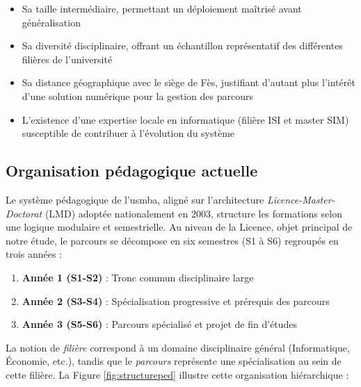 \documentclass[french,12pt]{report} %
\begin{document}
\begin{itemize}
    \item Sa taille intermédiaire, permettant un déploiement maîtrisé avant généralisation
    \item Sa diversité disciplinaire, offrant un échantillon représentatif des différentes filières de l'université
    \item Sa distance géographique avec le siège de Fès, justifiant d'autant plus l'intérêt d'une solution numérique pour la gestion des parcours
    \item L'existence d'une expertise locale en informatique (filière ISI et master SIM) susceptible de contribuer à l'évolution du système
\end{itemize}

\subsection{Organisation pédagogique actuelle}

Le système pédagogique de l'\gls{usmba}, aligné sur l'architecture \textit{Licence-Master-Doctorat} (LMD) adoptée nationalement en 2003, structure les formations selon une logique modulaire et semestrielle. Au niveau de la Licence, objet principal de notre étude, le parcours se décompose en six semestres (S1 à S6) regroupés en trois années :

\begin{enumerate}
    \item \textbf{Année 1 (S1-S2)} : Tronc commun disciplinaire large
    \item \textbf{Année 2 (S3-S4)} : Spécialisation progressive et prérequis des parcours
    \item \textbf{Année 3 (S5-S6)} : Parcours spécialisé et projet de fin d'études
\end{enumerate}

La notion de \textit{filière} correspond à un domaine disciplinaire général (Informatique, Économie, etc.), tandis que le \textit{parcours} représente une spécialisation au sein de cette filière. La Figure \ref{fig:structureped} illustre cette organisation hiérarchique :
\end{document}
